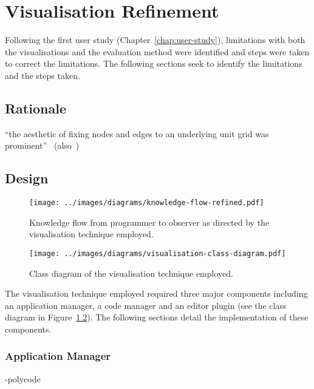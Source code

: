 
\chapter{Visualisation Refinement}
\label{chap:visualisation-refinement}

Following the first user study (Chapter~\ref{chap:user-study}), limitations with both the visualisations and the evaluation method were identified and steps were taken to correct the limitations. The following sections seek to identify the limitations and the steps taken.

\section{Rationale}

``the aesthetic of fixing nodes and edges to an underlying unit grid was prominent''~\cite{Purchase2014} (also~\cite{Purchase2001,Purchase1996})

\section{Design}

\begin{figure}
  \centering \texttt{[image: ../images/diagrams/knowledge-flow-refined.pdf]}
  \caption{Knowledge flow from programmer to observer as directed by the visualisation technique employed.}
\label{fig:knowledge-flow-refined}
\end{figure}

\begin{figure}
  \centering \texttt{[image: ../images/diagrams/visualisation-class-diagram.pdf]}
  \caption{Class diagram of the visualisation technique employed.}
\label{fig:visualisation-class-diagram}
\end{figure}

The visualisation technique employed required three major components including an application manager, a code manager and an editor plugin (see the class diagram in Figure~\ref{fig:visualisation-class-diagram}). The following sections detail the implementation of these components.

\subsection{Application Manager}

-polycode~\cite{Safrin2013}

